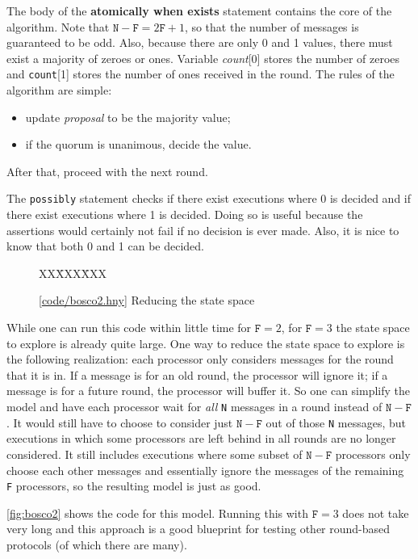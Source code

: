 \documentclass{report}
\newcommand{\harmonysource}[1]{
\begin{tabbing}
XX\=XXX\=XXX\kill
    
\end{tabbing}
}
\newcommand{\harmonylink}[1]{%
[\href{https://harmony.cs.cornell.edu/#1}{\underline{#1}}]%
}
\newenvironment{code}{
\tcolorbox
}{
\endtcolorbox
}
\begin{document}
The body of the \textbf{atomically when exists} statement contains the core of the algorithm.
Note that $\texttt{N} - \texttt{F} = 2\texttt{F} + 1$, so that the number of
messages is guaranteed to be odd.  Also, because there are only 0 and 1 values, there
must exist a majority of zeroes or ones.  Variable \textit{count}[0] stores the number
of zeroes and \texttt{count}[1] stores the number of ones received in the round.
The rules of the algorithm are simple:
\begin{itemize}
\item update \textit{proposal} to be the majority value;
\item if the quorum is unanimous, decide the value.
\end{itemize}
After that, proceed with the next round.

The \texttt{possibly} statement checks if there exist executions where 0 is
decided and if there exist executions where 1 is decided.  Doing so is useful
because the assertions would certainly not fail if no decision is ever made.
Also, it is nice to know that both 0 and 1 can be decided.

\begin{figure}
\begin{code}
\harmonysource{bosco2}
\end{code}
\caption{\harmonylink{code/bosco2.hny} Reducing the state space}
\label{fig:bosco2}
\end{figure}

While one can run this code within little time for $\mathtt{F} = 2$, for
$\mathtt{F} = 3$ the state space to explore is already quite large.
One way to reduce the state space to explore is the following realization:
each processor only considers messages for the round that it is in.
If a message is for an old round, the processor will ignore it;
if a message is for a future round, the processor will buffer it.
So one can simplify the model and have each processor wait
for \emph{all} \texttt{N} messages in a round
instead of $\mathtt{N} - \mathtt{F}$.
It would still have to choose to consider just $\mathtt{N} - \mathtt{F}$
out of those \texttt{N} messages, but executions in which some processors
are left behind in all rounds are no longer considered.
It still includes executions where some subset of $\mathtt{N} - \mathtt{F}$
processors only choose each other messages and essentially ignore the
messages of the remaining \texttt{F} processors, so the resulting model
is just as good.

\autoref{fig:bosco2} shows the code for this model.  Running this with
$\mathtt{F} = 3$ does not take very long and this approach is a good
blueprint for testing other round-based protocols (of which there are
many).
\end{document}

